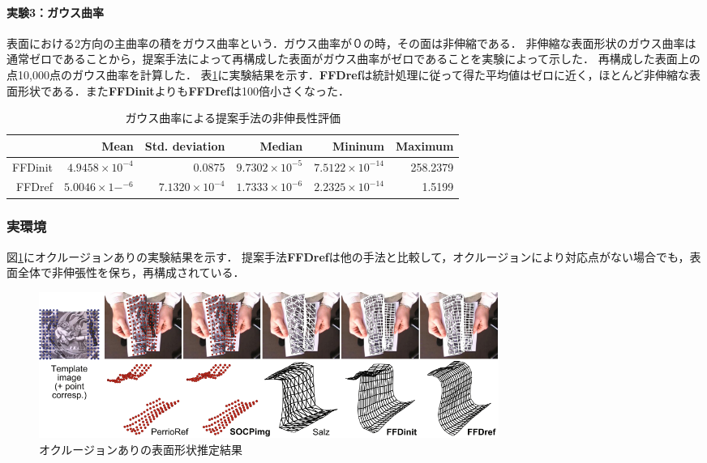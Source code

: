 \documentclass[10.5pt,twocolumn,a4j,fleqn]{ujarticle}
\def\figref#1{図\ref{#1}}
\def\tblref#1{表\ref{#1}}
\begin{document}
\paragraph{実験3：ガウス曲率}
表面における2方向の主曲率の積をガウス曲率という．ガウス曲率が０の時，その面は非伸縮である．
非伸縮な表面形状のガウス曲率は通常ゼロであることから，提案手法によって再構成した表面がガウス曲率がゼロであることを実験によって示した．
再構成した表面上の点10,000点のガウス曲率を計算した．
\tblref{table3}に実験結果を示す．{\bf FFDref}は統計処理に従って得た平均値はゼロに近く，ほとんど非伸縮な表面形状である．また{\bf FFDinit}よりも{\bf FFDref}は100倍小さくなった．
\begin{table}[htb]
  \caption{ガウス曲率による提案手法の非伸長性評価}
  \centering
  \begin{tabular}{|r|r|r|r|r|r|} \hline
      & Mean & Std. deviation & Median & Mininum & Maximum \\ \hline
      FFDinit& $4.9458\times10^{-4}$ & 0.0875 & $9.7302\times10^{-5}$ & $7.5122\times10^{-14}$ & 258.2379 \\ \hline
      FFDref& $5.0046\times1-^{-6}$ & $7.1320\times10^{-4}$ & $1.7333\times10^{-6}$ & $2.2325\times10^{-14}$ & 1.5199 \\ \hline
  \end{tabular}
  \label{table3}
\end{table}

\subsubsection{実環境}
\figref{fig5}にオクルージョンありの実験結果を示す．
提案手法{\bf FFDref}は他の手法と比較して，オクルージョンにより対応点がない場合でも，表面全体で非伸張性を保ち，再構成されている．
\begin{figure}[htbp]
 \begin{center}
  \includegraphics[width=150mm]{img/fig5.png}
  \caption{オクルージョンありの表面形状推定結果}
  \label{fig5}
 \end{center}
\end{figure}
\end{document}
